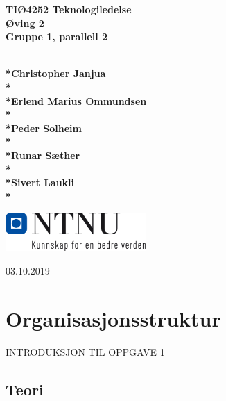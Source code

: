 \documentclass[11]{article}
\begin{document}
\renewcommand{\thefootnote}{\roman{footnote}}
\title{}
\author{}
\date{12.09.2019}

\begin{titlepage}
   \begin{center}
 
        \textbf{\huge TIØ4252 Teknologiledelse}\\
        \vspace{4cm}
        \textbf{\huge Øving 2}\\
        \vspace{0.5cm}
        \textbf{\small Gruppe 1, parallell 2}
        
        \vspace{5cm}
        
        \textbf{\small\\*Christopher Janjua\\* }
        \textbf{\small\\*Erlend Marius Ommundsen\\* }
        \textbf{\small\\*Peder Solheim\\* }
        \textbf{\small\\*Runar Sæther\\* }
        \textbf{\small\\*Sivert Laukli\\* }
        
        \vspace{1cm}
 
        \includegraphics[width=0.4\textwidth, draft=false]{Vedlegg/ntnuLogo.png}
 
        03.10.2019
 
   \end{center}
\end{titlepage}

\newpage



\newpage
\tableofcontents 

\newpage
\section{Organisasjonsstruktur}

INTRODUKSJON TIL OPPGAVE 1


\newpage
\subsection{Teori}
\end{document}
